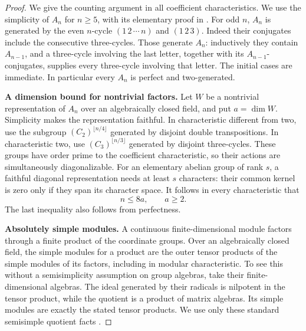 \begin{proof}
We give the counting argument in all coefficient characteristics.
We use the simplicity of \(A_n\) for \(n\geq5\), with its elementary
proof in \cite[Theorem 4.33 and Lemmas 4.35--4.36, pp.~69--70]
{MilneGT2025B}. For odd \(n\), \(A_n\) is generated by the even
\(n\)-cycle \((1\,2\,\cdots\,n)\) and \((1\,2\,3)\).
Indeed their conjugates include the consecutive three-cycles.
Those generate \(A_n\): inductively they contain \(A_{n-1}\), and
a three-cycle involving the last letter, together with its
\(A_{n-1}\)-conjugates, supplies every three-cycle involving that
letter. The initial cases are immediate. In particular every \(A_n\)
is perfect and two-generated.

\par\smallskip\noindent\textbf{A dimension bound for nontrivial factors.}\quad
Let \(W\) be a nontrivial representation of \(A_n\) over an
algebraically closed field, and put \(a=\dim W\).
Simplicity makes the representation faithful.
In characteristic different from two, use the subgroup
\((C_2)^{\lfloor n/4\rfloor}\) generated by disjoint double
transpositions. In characteristic two, use
\((C_3)^{\lfloor n/3\rfloor}\) generated by disjoint three-cycles.
These groups have order prime to the coefficient characteristic,
so their actions are simultaneously diagonalizable.
For an elementary abelian group of rank \(s\), a faithful diagonal
representation needs at least \(s\) characters: their common
kernel is zero only if they span its character space.
It follows in every characteristic that
\[
 n\leq8a,\qquad a\geq2.
 \tag{A3}
\]
The last inequality also follows from perfectness.

\par\smallskip\noindent\textbf{Absolutely simple modules.}\quad
A continuous finite-dimensional module factors through a finite
product of the coordinate groups. Over an algebraically closed
field, the simple modules for a product are the outer tensor
products of the simple modules of its factors, including in
modular characteristic. To see this without a semisimplicity
assumption on group algebras, take their finite-dimensional
algebras. The ideal generated by their radicals is nilpotent in
the tensor product, while the quotient is a product of matrix
algebras. Its simple modules are exactly the stated tensor
products. We use only these standard semisimple quotient facts
\cite[Theorems 7.25, 7.29, 7.36--7.37, pp.~110--114]{MilneGT2025B}.


\end{proof}
